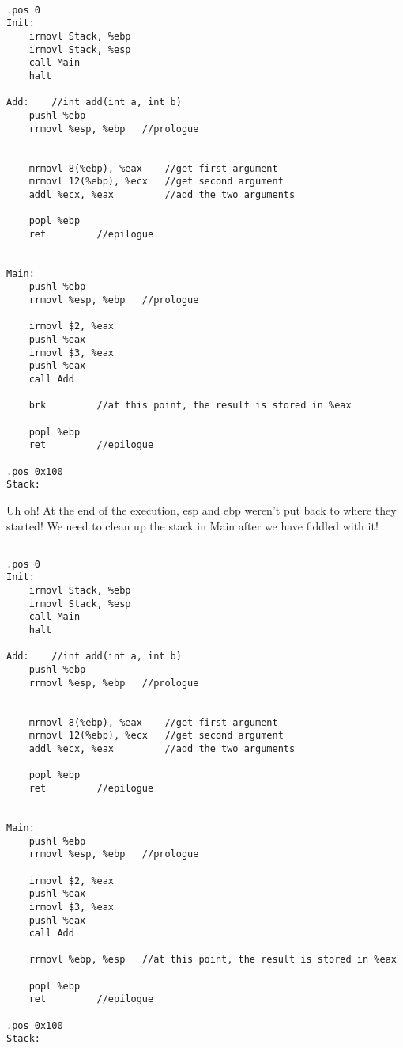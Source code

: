 \documentclass[10pt]{article}
\begin{document}
\begin{lstlisting}

.pos 0
Init:
    irmovl Stack, %ebp
    irmovl Stack, %esp
    call Main
    halt
    
Add:    //int add(int a, int b)
    pushl %ebp
    rrmovl %esp, %ebp   //prologue
    
    
    mrmovl 8(%ebp), %eax    //get first argument
    mrmovl 12(%ebp), %ecx   //get second argument
    addl %ecx, %eax         //add the two arguments
    
    popl %ebp
    ret         //epilogue
    
    
Main:
    pushl %ebp
    rrmovl %esp, %ebp   //prologue
    
    irmovl $2, %eax
    pushl %eax
    irmovl $3, %eax
    pushl %eax
    call Add
    
    brk         //at this point, the result is stored in %eax
    
    popl %ebp
    ret         //epilogue
    
.pos 0x100
Stack:

\end{lstlisting}


Uh oh! At the end of the execution, esp and ebp weren't put back to where they started! We need to clean up the stack in Main after we have fiddled with it!

\newpage

\begin{lstlisting}

.pos 0
Init:
    irmovl Stack, %ebp
    irmovl Stack, %esp
    call Main
    halt
    
Add:    //int add(int a, int b)
    pushl %ebp
    rrmovl %esp, %ebp   //prologue
    
    
    mrmovl 8(%ebp), %eax    //get first argument
    mrmovl 12(%ebp), %ecx   //get second argument
    addl %ecx, %eax         //add the two arguments
    
    popl %ebp
    ret         //epilogue
    
    
Main:
    pushl %ebp
    rrmovl %esp, %ebp   //prologue
    
    irmovl $2, %eax
    pushl %eax
    irmovl $3, %eax
    pushl %eax
    call Add
    
    rrmovl %ebp, %esp   //at this point, the result is stored in %eax
    
    popl %ebp
    ret         //epilogue
    
.pos 0x100
Stack:

\end{lstlisting}
\end{document}
